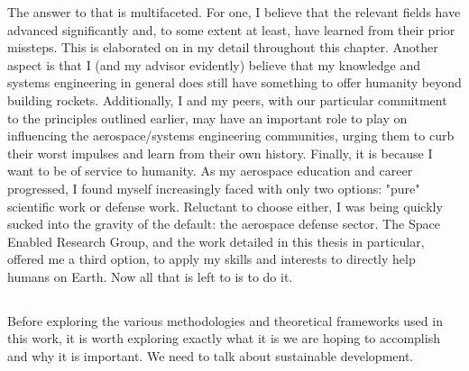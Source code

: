 The answer to that is multifaceted. For one, I believe that the relevant fields have advanced significantly and, to some extent at least, have learned from their prior missteps. This is elaborated on in my detail throughout this chapter. Another aspect is that I (and my advisor evidently) believe that my knowledge and systems engineering in general does still have something to offer humanity beyond building rockets. Additionally, I and my peers, with our particular commitment to the principles outlined earlier, may have an important role to play on influencing the aerospace/systems engineering communities, urging them to curb their worst impulses and learn from their own history. Finally, it is because I want to be of service to humanity. As my aerospace education and career progressed, I found myself increasingly faced with only two options: "pure" scientific work or defense work. Reluctant to choose either, I was being quickly sucked into the gravity of the default: the aerospace defense sector. The Space Enabled Research Group, and the work detailed in this thesis in particular, offered me a third option, to apply my skills and interests to directly help humans on Earth. Now all that is left to is to do it.

\subsection{}

Before exploring the various methodologies and theoretical frameworks used in this work, it is worth exploring exactly what it is we are hoping to accomplish and why it is important. We need to talk about sustainable development.
 
\subsubsection{} \label{sec:sustain}


